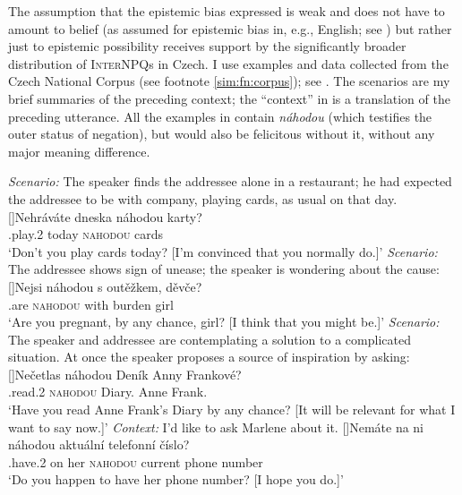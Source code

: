 \documentclass[output=paper,colorlinks,citecolor=brown]{langscibook}
\begin{document}
The assumption that the epistemic bias expressed is weak and does not have to amount to belief (as assumed for epistemic bias in, e.g., English; see ) but rather just to epistemic possibility receives support by the significantly broader distribution of \textsc{InterNPQ}s in Czech. I use examples and data collected from the Czech National Corpus (see footnote \ref{sim:fn:corpus}); see . The scenarios are my brief summaries of the preceding context; the ``context'' in  is a translation of the preceding utterance. All the examples in  contain \textit{náhodou} (which testifies the outer status of negation), but would also be felicitous without it, without any major meaning difference.

\eanoraggedright\label{sim:ex:functions-ne}
\begin{xlist}
\ex \textit{Scenario:} The speaker finds the addressee alone in a restaurant; he had expected the addressee to be with company, playing cards, as usual on that day.\label{sim:ex:functions-ne-bel}
\exi{}[]{\gll Nehráváte dneska náhodou karty?\\
{\NEG}.play.2{\PL} today \textsc{nahodou} cards\\
\glt `Don't you play cards today? [I'm convinced that you normally do.]'}
\ex\textit{Scenario:} The addressee shows sign of unease; the speaker is wondering about the cause:\label{sim:ex:functions-ne-expl}
\exi{}[]{\gll Nejsi náhodou s outěžkem, děvče?\\
{\NEG}.are \textsc{nahodou} with burden girl\\
\glt `Are you pregnant, by any chance, girl? [I think that you might be.]'}
\ex \textit{Scenario:} The speaker and addressee are contemplating a solution to a complicated situation. At once the speaker proposes a source of inspiration by asking:\label{sim:ex:functions-ne-rel}
\exi{}[]{\gll Nečetlas náhodou Deník Anny Frankové?\\
{\NEG}.read.2{\SG} \textsc{nahodou} Diary.{\ACC} Anne Frank.{\GEN}\\
\glt `Have you read Anne Frank's Diary by any chance? [It will be relevant for what I want to say now.]'}
\ex \textit{Context:} I'd like to ask Marlene about it.\label{sim:ex:functions-ne-hope}
\exi{}[]{\gll Nemáte na ni náhodou aktuální telefonní číslo?\\
{\NEG}.have.2 on her \textsc{nahodou} current phone number\\
\glt `Do you happen to have her phone number? [I hope you do.]'}
\end{xlist}
\z
\end{document}
